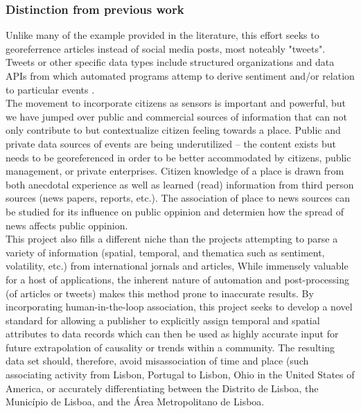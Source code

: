 

\subsubsection{Distinction from previous work}
Unlike many of the example provided in the literature, this effort seeks to georeferrence articles instead of social media posts, most noteably "tweets".  Tweets or other specific data types include structured organizations and data APIs from which automated programs attemp to derive sentiment and/or relation to particular events \cite{Snyder2019}.\\

The movement to incorporate citizens as sensors is important and powerful, but we have jumped over public and commercial sources of information that can not only contribute to but contextualize citizen feeling towards a place. Public and private data sources of events are being underutilized -- the content exists but needs to be georeferenced in order to be better accommodated by citizens, public management, or private enterprises. Citizen knowledge of a place is drawn from both anecdotal experience as well as learned (read) information from third person sources (news papers, reports, etc.). The association of place to news sources can be studied for its influence on public oppinion and determien how the spread of news affects public oppinion.\\

This project also fills a different niche than the projects attempting to parse a variety of information (spatial, temporal, and thematica such as sentiment, volatility, etc.) from international jornals and articles, While immensely valuable for a host of applications, the inherent nature of automation and post-processing (of articles or tweets) makes this method prone to inaccurate results. By incorporating human-in-the-loop association, this project seeks to develop a novel standard for allowing a publisher to explicitly assign temporal and spatial attributes to data records which can then be used as highly accurate input for future extrapolation of causality or trends within a community. The resulting data set should, therefore, avoid misassociation of time and place (such associating activity from Lisbon, Portugal to Lisbon, Ohio in the United States of America, or accurately differentiating between the Distrito de Lisboa, the Município de Lisboa, and the Área Metropolitano de Lisboa.\\

